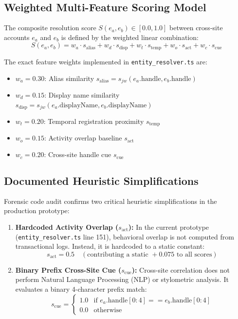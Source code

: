 \subsection{Weighted Multi-Feature Scoring Model}
The composite resolution score $S(e_a, e_b) \in [0.0, 1.0]$ between cross-site accounts $e_a$ and $e_b$ is defined by the weighted linear combination:
\begin{equation}
\label{eq:composite-score}
S(e_a, e_b) = w_a \cdot s_{\text{alias}} + w_d \cdot s_{\text{disp}} + w_t \cdot s_{\text{temp}} + w_o \cdot s_{\text{act}} + w_c \cdot s_{\text{cue}}
\end{equation}

The exact feature weights implemented in \texttt{entity\_resolver.ts} are:
\begin{itemize}
    \item $w_a = 0.30$: Alias similarity $s_{\text{alias}} = s_{jw}(e_a.\text{handle}, e_b.\text{handle})$
    \item $w_d = 0.15$: Display name similarity $s_{\text{disp}} = s_{jw}(e_a.\text{displayName}, e_b.\text{displayName})$
    \item $w_t = 0.20$: Temporal registration proximity $s_{\text{temp}}$
    \item $w_o = 0.15$: Activity overlap baseline $s_{\text{act}}$
    \item $w_c = 0.20$: Cross-site handle cue $s_{\text{cue}}$
\end{itemize}

\subsection{Documented Heuristic Simplifications}
Forensic code audit confirms two critical heuristic simplifications in the production prototype:
\begin{enumerate}
    \item \textbf{Hardcoded Activity Overlap ($s_{\text{act}}$):} In the current prototype (\texttt{entity\_resolver.ts} line 151), behavioral overlap is not computed from transactional logs. Instead, it is hardcoded to a static constant:
    \begin{equation}
    \label{eq:act-hardcode}
    s_{\text{act}} = 0.5 \quad (\text{contributing a static } +0.075 \text{ to all scores})
    \end{equation}
    \item \textbf{Binary Prefix Cross-Site Cue ($s_{\text{cue}}$):} Cross-site correlation does not perform Natural Language Processing (NLP) or stylometric analysis. It evaluates a binary 4-character prefix match:
    \begin{equation}
    \label{eq:cue-hardcode}
    s_{\text{cue}} = \begin{cases} 
    1.0 & \text{if } e_a.\text{handle}[0:4] == e_b.\text{handle}[0:4] \\
    0.0 & \text{otherwise}
    \end{cases}
    \end{equation}
\end{enumerate}

